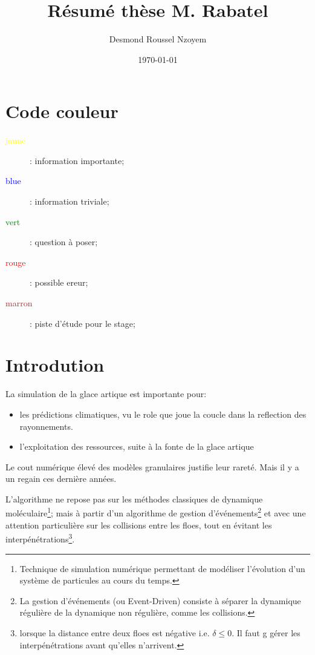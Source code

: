 \documentclass[
  french,
	11pt, %
]{fphw}
\title{Résumé thèse M. Rabatel} %
\author{Desmond Roussel Nzoyem} %
\date{\today} %
\institute{Université de Strasbourg, Sorbone Université \\ Laboratoire Jacques-Louis Lions} %
\begin{document}
\maketitle %

\section*{Code couleur}
\begin{description}
  \item[\textcolor{yellow}{jaune}]: information importante;
  \item[\textcolor{blue}{blue}]: information triviale;
  \item[\textcolor{green}{vert}]: question à poser;
  \item[\textcolor{red}{rouge}]: possible ereur;
  \item[\textcolor{brown}{marron}]: piste d'étude pour le stage;
\end{description}


\section*{Introdution}

La simulation de la glace artique est importante pour:
\begin{itemize}
  \item les prédictions climatiques, vu le role que joue la coucle dans la reflection des rayonnements.
  \item l'exploitation des ressources, suite à la fonte de la glace artique
\end{itemize}

Le cout numérique élevé des modèles granulaires justifie leur rareté. Mais il y a un regain ces dernière années. 

L'algorithme ne repose pas sur les méthodes classiques de dynamique moléculaire\footnote{Technique de simulation numérique permettant de modéliser l'évolution d'un système de particules au cours du temps.}; mais à partir d’un algorithme de gestion d’événements\footnote{La gestion d’événements (ou Event-Driven) consiste à séparer la dynamique régulière de la dynamique non régulière, comme les collisions.} et avec une attention particulière sur les collisions entre les floes, tout en évitant les interpénétrations\footnote{lorsque la distance entre deux floes est négative i.e. $\delta \leq 0$. Il faut g gérer les interpénétrations avant qu'elles n'arrivent.}. 
\end{document}
